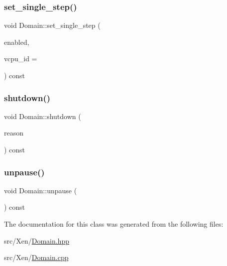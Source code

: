\mbox{\label{classxd_1_1xen_1_1_domain_ac877c43e5572916307dda8d591323541}} 
\subsubsection{\texorpdfstring{set\+\_\+single\+\_\+step()}{set\_single\_step()}}
{\footnotesize\ttfamily void Domain\+::set\+\_\+single\+\_\+step (\begin{DoxyParamCaption}\item[{bool}]{enabled,  }\item[{\mbox{\hyperlink{namespacexd_1_1xen_ac71045dda8a7d9d6fd0d7643001bb14e}{V\+C\+P\+U\+\_\+\+ID}}}]{vcpu\+\_\+id = {} }\end{DoxyParamCaption}) const}

\mbox{\label{classxd_1_1xen_1_1_domain_a1c5f58120120c4409d7ef908dfcef874}} 
\subsubsection{\texorpdfstring{shutdown()}{shutdown()}}
{\footnotesize\ttfamily void Domain\+::shutdown (\begin{DoxyParamCaption}\item[{int}]{reason }\end{DoxyParamCaption}) const}

\mbox{\label{classxd_1_1xen_1_1_domain_a8fc0a38d040a20073eacfaf7f4c9145f}} 
\subsubsection{\texorpdfstring{unpause()}{unpause()}}
{\footnotesize\ttfamily void Domain\+::unpause (\begin{DoxyParamCaption}{ }\end{DoxyParamCaption}) const}



The documentation for this class was generated from the following files\+:\begin{DoxyCompactItemize}
\item 
src/\+Xen/\mbox{\hyperlink{_domain_8hpp}{Domain.\+hpp}}\item 
src/\+Xen/\mbox{\hyperlink{_domain_8cpp}{Domain.\+cpp}}\end{DoxyCompactItemize}
